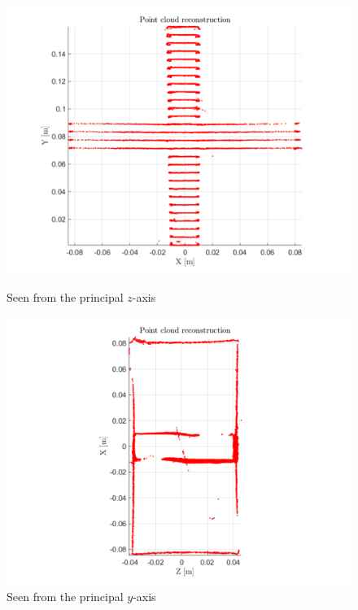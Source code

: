 \begin{figure}[H]
    \centering
    \begin{minipage}[t]{0.48\textwidth}
        \centering
        \includegraphics[width=1.25\textwidth]{figures/reconstruction/crossPC2.pdf}
        \caption{Seen from the principal $z$-axis }
    \label{fig:crossPC2}
    \end{minipage}%
    \hspace{.03\textwidth}
    \begin{minipage}[t]{0.48\textwidth}
        \centering
        \includegraphics[width=1.25\textwidth]{figures/reconstruction/crossPC3.pdf}
        \caption{Seen from the principal $y$-axis}
        \label{fig:crossPC3}
    \end{minipage}
\end{figure}

